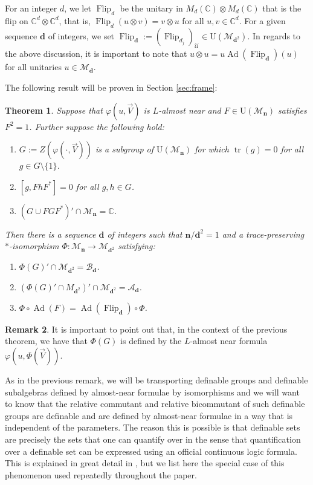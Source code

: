 \documentclass[12pt]{amsart}
\numberwithin{equation}{section}
\newtheorem{thm}{Theorem}[section]
\theoremstyle{definition}
\newtheorem{remark}[thm]{Remark}
\newcommand{\C}{\mathbb{C}}
\def\bb{\mathbb}
\def\cal{\mathcal}
\def\M{\mathcal{M}}
\DeclareMathOperator{\tr}{tr}
\newcommand\cU{{\cal U}}
\def \M{\mathcal{M}}
\def \A{\mathcal{A}}
\def \B{\mathcal{B}}
\begin{document}
For an integer $d$, we let $\operatorname{Flip}_d$ be the unitary in $M_d(\C)\otimes M_d(\C)$ that is the flip on $\C^d\otimes \C^d$, that is, $\operatorname{Flip}_d(u\otimes v)=v\otimes u$ for all $u,v\in \bb C^d$.  For a given sequence $\mathbf{d}$ of integers, we set $\operatorname{Flip}_{\mathbf{d}}:=(\operatorname{Flip}_{d_j})_\cU\in \mathrm{U}(\M_{\mathbf{d}^2})$.  In regards to the above discussion, it is important to note that $u\otimes u=u\operatorname{Ad}(\operatorname{Flip}_{\mathbf{d}})(u)$ for all unitaries $u\in \M_{\mathbf{d}}$.

The following result will be proven in Section \ref{sec:frame}:

\begin{thm}\label{thm:frame}
Suppose that $\varphi(u,\vec V)$ is $L$-almost near and $F\in \mathrm{U}(\M_{\mathbf{n}})$ satisfies $F^2=1$.  Further suppose the following hold:
\begin{enumerate}
    \item $G:=Z(\varphi(\cdot,\vec V))$ is a subgroup of $\mathrm{U}(\M_{\mathbf{n}})$ for which $\tr(g)=0$ for all $g\in G\setminus \{1\}$.
    \item $[g,FhF^*]=0$ for all $g,h\in G$.
    \item $(G\cup FGF^*)'\cap \M_{\mathbf{n}}=\mathbb{C}$.
\end{enumerate}
Then there is a sequence $\mathbf{d}$ of integers such that $\mathbf{n}/\mathbf{d}^2=1$ and a trace-preserving $*$-isomorphism $\Phi:\M_{\mathbf{n}}\to \M_{\mathbf{d}^2}$ satisfying:
\begin{enumerate}
    \item[(i)] $\Phi(G)'\cap \M_{\mathbf{d}^2}=\B_{\mathbf{d}}$.
    \item[(ii)] $(\Phi(G)'\cap M_{\mathbf{d}^2})'\cap \M_{\mathbf{d}^2}=\A_{\mathbf{d}}$.
    \item[(iii)] $\Phi \circ \operatorname{Ad}(F)=\operatorname{Ad}(\operatorname{Flip}_{\mathbf{d}})\circ \Phi$.
\end{enumerate}
\end{thm}

\begin{remark}
It is important to point out that, in the context of the previous theorem, we have that $\Phi(G)$ is defined by the $L$-almost near formula $\varphi(u,\Phi(\vec V))$.
\end{remark}

As in the previous remark, we will be transporting definable groups and definable subalgebras defined by almost-near formulae by isomorphisms and we will want to know that the relative commutant and relative bicommutant of such definable groups are definable and are defined by almost-near formulae in a way that is independent of the parameters.  The reason this is possible is that definable sets are precisely the sets that one can quantify over in the sense that quantification over a definable set can be expressed using an official continuous logic formula.  This is explained in great detail in \cite{goldbringspectralgap}, but we list here the special case of this phenomenon used repeatedly throughout the paper.
\end{document}
